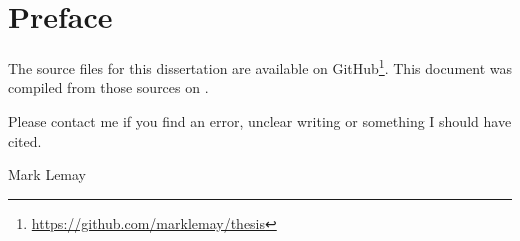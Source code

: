 \newpage\section*{Preface}

The source files for this dissertation are available on GitHub\footnote{\url{https://github.com/marklemay/thesis}}.
This document was compiled from those sources on \DTMnow. %
 
Please contact me if you find an error, unclear writing or something I should have cited.

\hfill{Mark Lemay}